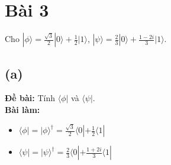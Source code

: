 \section{Bài 3}
Cho $|\phi\rangle=\frac{\sqrt{3}}{2}|0\rangle+\frac{1}{2}|1\rangle$, $|\psi\rangle=\frac{2}{3}|0\rangle+\frac{1-2i}{3}|1\rangle$.

\subsection{(a)}
\textbf{Đề bài:} Tính $\langle\phi|$ và $\langle\psi|$.\\
\textbf{Bài làm:}
\begin{itemize}
    \item $\langle\phi| = |\phi\rangle^\dagger = \frac{\sqrt{3}}{2}\langle0|+\frac{1}{2}\langle1|$
    \item $\langle\psi| = |\psi\rangle^\dagger = \frac{2}{3}\langle0|+\frac{1+2i}{3}\langle1|$
\end{itemize}

